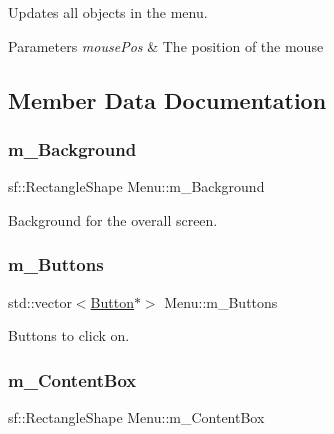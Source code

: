 Updates all objects in the menu. 


\begin{DoxyParams}{Parameters}
{\em mouse\+Pos} & The position of the mouse \\
\hline
\end{DoxyParams}


\subsection{Member Data Documentation}
\mbox{\label{class_menu_a286029cece23aec0264441cdbc55e150}} 
\subsubsection{\texorpdfstring{m\+\_\+\+Background}{m\_Background}}
{\footnotesize\ttfamily sf\+::\+Rectangle\+Shape Menu\+::m\+\_\+\+Background\hspace{0.3cm}{\ttfamily [private]}}



Background for the overall screen. 

\mbox{\label{class_menu_ac32ce970534165a8fba07c28195c06bf}} 
\subsubsection{\texorpdfstring{m\+\_\+\+Buttons}{m\_Buttons}}
{\footnotesize\ttfamily std\+::vector$<$\hyperlink{class_button}{Button}$\ast$$>$ Menu\+::m\+\_\+\+Buttons\hspace{0.3cm}{\ttfamily [private]}}



Buttons to click on. 

\mbox{\label{class_menu_a963e1ea48fad891a3f96e98d97616dd2}} 
\subsubsection{\texorpdfstring{m\+\_\+\+Content\+Box}{m\_ContentBox}}
{\footnotesize\ttfamily sf\+::\+Rectangle\+Shape Menu\+::m\+\_\+\+Content\+Box\hspace{0.3cm}{\ttfamily [private]}}



